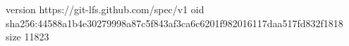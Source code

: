 version https://git-lfs.github.com/spec/v1
oid sha256:44588a1b4e30279998a87c5f843af3ca6c6201f982016117daa517fd832f1818
size 11823
